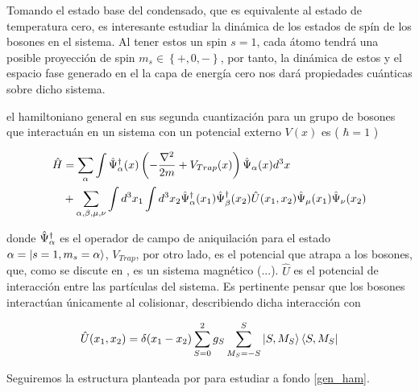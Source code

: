 
Tomando el estado base del condensado, que es equivalente al estado de temperatura cero, es interesante estudiar la dinámica de los estados de spín de los bosones en el sistema. Al tener estos un spin $s = 1$, cada átomo tendrá una posible proyección de spin $m_s \in \left\lbrace +,0,- \right\rbrace$, por tanto, la dinámica de estos y el espacio fase generado en el la capa de energía cero nos dará propiedades cuánticas sobre dicho sistema. 

el hamiltoniano general en sus segunda cuantización para un grupo de bosones que interactuán en un sistema con un potencial externo $V(x)$ es ( $ \hbar = 1$ )

\begin{equation}
\begin{split}
\hat{H} & = \sum_{\alpha} \int \hat{\Psi}^{\dagger}_\alpha(x) \left( -\frac{\nabla^2}{2m} + V_{Trap}(x) \right) \hat{\Psi}_{\alpha}(x) d^3x \\ 
& + \sum_{\alpha,\beta, \mu, \nu} \int d^3x_1 \int d^3x_2  	\hat{\Psi}^{\dagger}_\alpha(x_1) \hat{\Psi}^{\dagger}_\beta(x_2) \hat{U}(x_1,x_2) \hat{\Psi}_{\mu}(x_1) \hat{\Psi}_{\nu}(x_2)
\end{split}
\label{gen_ham}
\end{equation}

donde $\hat{\Psi}^{\dagger}_\alpha$ es el operador de campo de aniquilación para el estado $\alpha = \left|s=1,m_s=\alpha\right\rangle$, $V_{Trap}$, por otro lado, es el potencial que atrapa a los bosones, que, como se discute en \cite{trap}, es un sistema magnético (...).
$\hat{U}$ es el potencial de interacción entre las partículas del sistema. Es pertinente pensar que los bosones interactúan únicamente al colisionar, describiendo dicha interacción con

\begin{equation}
\hat{U}(x_1,x_2) = \delta{(x_1 - x_2)} \sum_{S=0}^2 g_S \sum_{M_S=-S}^S \left|S,M_S\right\rangle\left\langle S,M_S\right|
\label{pseudopot}
\end{equation}

Seguiremos la estructura planteada por \cite{law98} para estudiar a fondo \ref{gen_ham}.  




